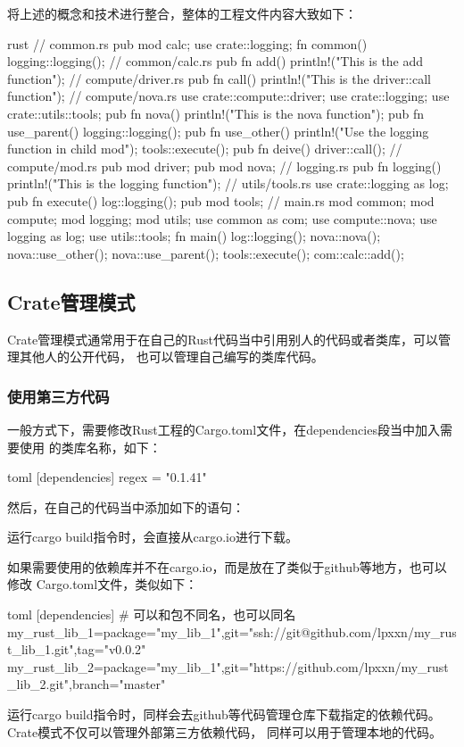 将上述的概念和技术进行整合，整体的工程文件内容大致如下：
\begin{code-block}{rust}
// common.rs
pub mod calc;
use crate::logging;
fn common() { logging::logging(); }
// common/calc.rs
pub fn add() { println!("This is the add function"); }
// compute/driver.rs
pub fn call() { println!("This is the driver::call function"); }
// compute/nova.rs
use crate::compute::driver;
use crate::logging;
use crate::utils::tools;
pub fn nova() { println!("This is the nova function"); }
pub fn use_parent() {
    logging::logging();
}
pub fn use_other() {
    println!("Use the logging function in child mod");
    tools::execute();
}
pub fn deive() { driver::call(); }
// compute/mod.rs
pub mod driver;
pub mod nova;
// logging.rs
pub fn logging() { println!("This is the logging function"); }
// utils/tools.rs
use crate::logging as log;
pub fn execute() { log::logging(); }
pub mod tools;
// main.rs
mod common;
mod compute;
mod logging;
mod utils;
use common as com;
use compute::nova;
use logging as log;
use utils::tools;
fn main() {
    log::logging();
    nova::nova();
    nova::use_other();
    nova::use_parent();
    tools::execute();
    com::calc::add();
}
\end{code-block}

\subsection{Crate管理模式}
Crate管理模式通常用于在自己的Rust代码当中引用别人的代码或者类库，可以管理其他人的公开代码，
也可以管理自己编写的类库代码。

\subsubsection{使用第三方代码}
一般方式下，需要修改Rust工程的Cargo.toml文件，在dependencies段当中加入需要使用
的类库名称，如下：
\begin{code-block}{toml}
[dependencies]
regex = "0.1.41"
\end{code-block}
然后，在自己的代码当中添加如下的语句：
运行cargo build指令时，会直接从cargo.io进行下载。

如果需要使用的依赖库并不在cargo.io，而是放在了类似于github等地方，也可以修改
Cargo.toml文件，类似如下：
\begin{code-block}{toml}
[dependencies]
# 可以和包不同名，也可以同名
my_rust_lib_1={package="my_lib_1",git="ssh://git@github.com/lpxxn/my_rust_lib_1.git",tag="v0.0.2"}
my_rust_lib_2={package="my_lib_1",git="https://github.com/lpxxn/my_rust_lib_2.git",branch="master"}
\end{code-block}
运行cargo build指令时，同样会去github等代码管理仓库下载指定的依赖代码。Crate模式不仅可以管理外部第三方依赖代码，
同样可以用于管理本地的代码。

